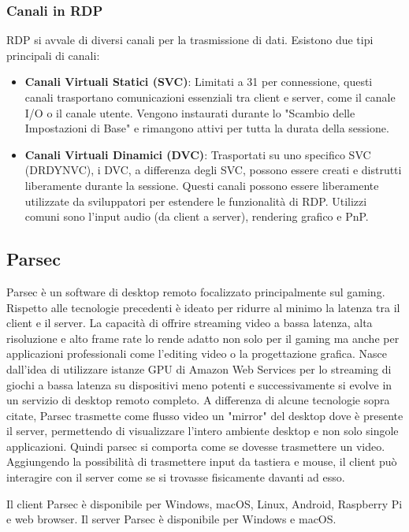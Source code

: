 \documentclass[12pt,a4paper,openright,twoside]{book}
\begin{document}
\subsubsection{Canali in RDP}
RDP si avvale di diversi canali per la trasmissione di dati. Esistono due tipi principali di canali:
\begin{itemize}
    \item \textbf{Canali Virtuali Statici (SVC)}: Limitati a 31 per connessione, questi canali trasportano comunicazioni essenziali tra client e server, come il canale I/O o il canale utente. Vengono instaurati durante lo "Scambio delle Impostazioni di Base" e rimangono attivi per tutta la durata della sessione.
    \item \textbf{Canali Virtuali Dinamici (DVC)}: Trasportati su uno specifico SVC (DRDYNVC), i DVC, a differenza degli SVC, possono essere creati e distrutti liberamente durante la sessione. Questi canali possono essere liberamente utilizzate da sviluppatori per estendere le funzionalità di RDP. Utilizzi comuni sono l'input audio (da client a server), rendering grafico e PnP.
\end{itemize}

\subsection{Parsec}
Parsec è un software di desktop remoto focalizzato principalmente sul gaming. Rispetto alle tecnologie precedenti è ideato per ridurre al minimo la latenza tra il client e il server. La capacità di offrire streaming video a bassa latenza, alta risoluzione e alto frame rate lo rende adatto non solo per il gaming ma anche per applicazioni professionali come l'editing video o la progettazione grafica.
Nasce dall'idea di utilizzare istanze GPU di Amazon Web Services per lo streaming di giochi a bassa latenza su dispositivi meno potenti e successivamente si evolve in un servizio di desktop remoto completo.
A differenza di alcune tecnologie sopra citate, Parsec trasmette come flusso video un "mirror" del desktop dove è presente il server, permettendo di visualizzare l'intero ambiente desktop e non solo singole applicazioni. Quindi parsec si comporta come se dovesse trasmettere un video. Aggiungendo la possibilità di trasmettere input da tastiera e mouse, il client può interagire con il server come se si trovasse fisicamente davanti ad esso.

Il client Parsec è disponibile per Windows, macOS, Linux, Android, Raspberry Pi e web browser. Il server Parsec è disponibile per Windows e macOS. 
\end{document}
